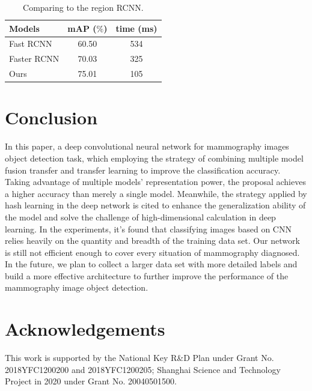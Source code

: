 \documentclass[12pt]{article}
\begin{document}
\begin{table}[ht]
  \renewcommand{\arraystretch}{1.3}
  \caption{Comparing to the region RCNN.}
  \label{tab:tabOD}
  \begin{center}
  \begin{tabular}{|l|c|c|}
    \hline
        
        Models & mAP ($\%$) & time (ms) \\
        
        \hline
        
        Fast RCNN   & 60.50 & 534 \\
        Faster RCNN & 70.03 & 325 \\
        Ours        & 75.01 & 105 \\

        \hline
  \end{tabular}
  \end{center}
  \end{table}

\section{Conclusion}
\label{sec:Conc}

In this paper, a deep convolutional neural 
network for mammography images object detection 
task, which employing the strategy of combining 
multiple model fusion transfer and transfer 
learning to improve the classification accuracy. 
Taking advantage of multiple models’ 
representation power, the proposal achieves a 
higher accuracy than merely a single model. 
Meanwhile, the strategy applied by hash 
learning in the deep network is cited to 
enhance the generalization ability of the 
model and solve the challenge of 
high-dimensional calculation in deep learning.
In the experiments, it's found that classifying 
images based on CNN relies heavily on the 
quantity and breadth of the training data set. 
Our network is still not efficient enough to 
cover every situation of mammography diagnosed. 
In the future, we plan to collect a larger 
data set with more detailed labels and build 
a more effective architecture to further 
improve the performance of the mammography 
image object detection.

\section{Acknowledgements}
\label{sec:Acknowledgement}

This work is supported by the National 
Key R\&D Plan under Grant No. 
2018YFC1200200 and 2018YFC1200205; 
Shanghai Science and Technology Project 
in 2020 under Grant No. 20040501500.
\end{document}
